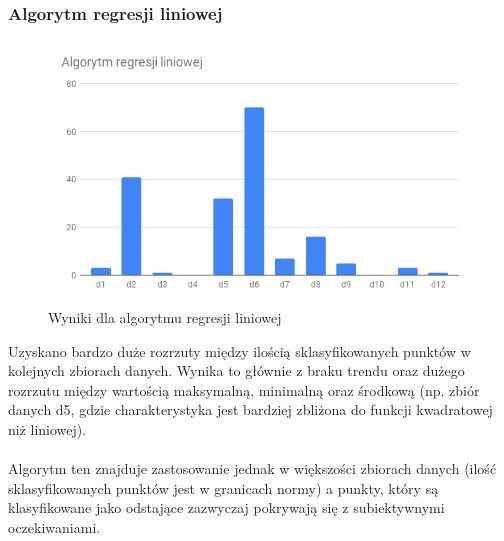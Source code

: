 \documentclass[eng,printmode]{mgr}
\begin{document}
\subsubsection{Algorytm regresji liniowej}
\begin{figure}[H]
  \begin{center}
  \includegraphics[scale=0.7]{r_reg}
  \end{center}
  \caption{Wyniki dla algorytmu regresji liniowej}
  \label{fig:r_reg}
\end{figure}
Uzyskano bardzo duże rozrzuty między ilością sklasyfikowanych punktów w kolejnych zbiorach danych. Wynika to głównie z braku trendu oraz dużego rozrzutu między wartością maksymalną, minimalną oraz środkową (np. zbiór danych d5, gdzie charakterystyka jest bardziej zbliżona do funkcji kwadratowej niż liniowej).
\\\\
Algorytm ten znajduje zastosowanie jednak w większości zbiorach danych (ilość sklasyfikowanych punktów jest w granicach normy) a punkty, który są klasyfikowane jako odstające zazwyczaj pokrywają się z subiektywnymi oczekiwaniami.
\end{document}
